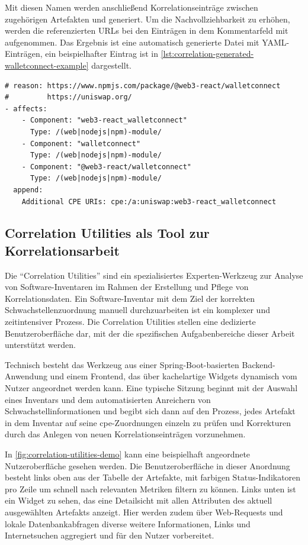 Mit diesen Namen werden anschließend Korrelationseinträge zwischen zugehörigen Artefakten und  generiert.
Um die Nachvollziehbarkeit zu erhöhen, werden die referenzierten URLs bei den Einträgen in dem Kommentarfeld mit aufgenommen.
Das Ergebnis ist eine automatisch generierte Datei mit YAML-Einträgen, ein beispielhafter Eintrag ist in \autoref{lst:correlation-generated-walletconnect-example} dargestellt.

\begin{lstlisting}[style=yaml,caption={Automatisch generierte Korrelationseinträge zu react-walletconnect},label={lst:correlation-generated-walletconnect-example}]
# reason: https://www.npmjs.com/package/@web3-react/walletconnect
#         https://uniswap.org/
- affects:
    - Component: "web3-react_walletconnect"
      Type: /(web|nodejs|npm)-module/
    - Component: "walletconnect"
      Type: /(web|nodejs|npm)-module/
    - Component: "@web3-react/walletconnect"
      Type: /(web|nodejs|npm)-module/
  append:
    Additional CPE URIs: cpe:/a:uniswap:web3-react_walletconnect
\end{lstlisting}

\subsection{Correlation Utilities als Tool zur Korrelationsarbeit}

Die \enquote{Correlation Utilities} sind ein spezialisiertes Experten-Werkzeug zur Analyse von Software-Inventaren im Rahmen der Erstellung und Pflege von Korrelationsdaten.
Ein Software-Inventar mit dem Ziel der korrekten Schwachstellenzuordnung manuell durchzuarbeiten ist ein komplexer und zeitintensiver Prozess.
Die Correlation Utilities stellen eine dedizierte Benutzeroberfläche dar, mit der die spezifischen Aufgabenbereiche dieser Arbeit unterstützt werden.

Technisch besteht das Werkzeug aus einer Spring-Boot-basierten Backend-Anwendung und einem Frontend, das über kachelartige Widgets dynamisch vom Nutzer angeordnet werden kann.
Eine typische Sitzung beginnt mit der Auswahl eines Inventars und dem automatisierten Anreichern von Schwachstellinformationen und begibt sich dann auf den Prozess, jedes Artefakt in dem Inventar auf seine \acrshort{cpe}-Zuordnungen einzeln zu prüfen und Korrekturen durch das Anlegen von neuen Korrelationseinträgen vorzunehmen.

In \autoref{fig:correlation-utilities-demo} kann eine beispielhaft angeordnete Nutzeroberfläche gesehen werden.
Die Benutzeroberfläche in dieser Anordnung besteht links oben aus der Tabelle der Artefakte, mit farbigen Status-Indikatoren pro Zeile um schnell nach relevanten Metriken filtern zu können.
Links unten ist ein Widget zu sehen, das eine Detailsicht mit allen Attributen des aktuell ausgewählten Artefakts anzeigt.
Hier werden zudem über Web-Requests und lokale Datenbankabfragen diverse weitere Informationen, Links und Internetsuchen aggregiert und für den Nutzer vorbereitet.

